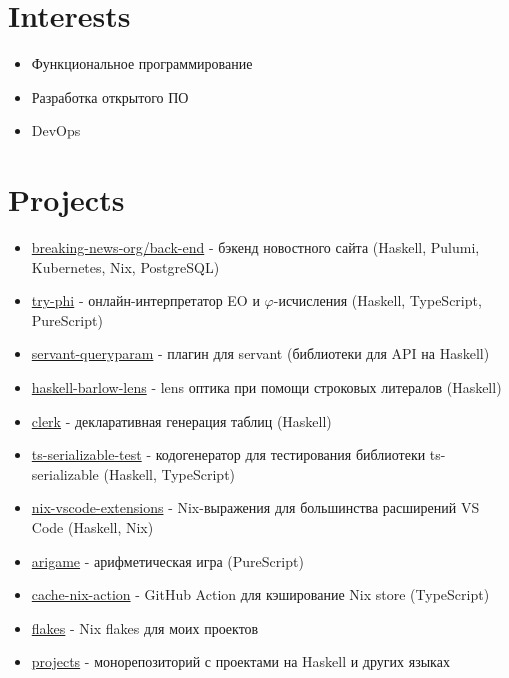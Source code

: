 \documentclass[twocolumn,11pt]{report}
\begin{document}
\section*{Interests}
\begin{itemize}
     \itemsep0em
     \item Функциональное программирование
     \item Разработка открытого ПО
     \item DevOps
\end{itemize}

\section*{Projects}
\begin{itemize}
     \itemsep0em
     \item \href{https://github.com/breaking-news-org/back-end#readme}{breaking-news-org/back-end} - бэкенд новостного сайта (Haskell, Pulumi, Kubernetes, Nix, PostgreSQL)
     \item \href{https://github.com/objectionary/try-phi#readme}{try-phi} - онлайн-интерпретатор EO и $\varphi$-исчисления (Haskell, TypeScript, PureScript)
     \item \href{https://github.com/deemp/servant-queryparam#readme}{servant-queryparam} - плагин для servant (библиотеки для API на Haskell)
     \item \href{https://github.com/deemp/haskell-barlow-lens#readme}{haskell-barlow-lens} - lens оптика при помощи строковых литералов (Haskell)
     \item \href{https://github.com/deemp/clerk#readme}{clerk} - декларативная генерация таблиц (Haskell)
     \item \href{https://github.com/deemp/projects/tree/main/haskell/ts-serializable-test#readme}{ts-serializable-test} - кодогенератор для тестирования библиотеки ts-serializable (Haskell, TypeScript)
     \item \href{https://github.com/nix-community/nix-vscode-extensions#readme}{nix-vscode-extensions} - Nix-выражения для большинства расширений VS Code (Haskell, Nix)
     \item \href{https://github.com/deemp/arigame#readme}{arigame} - арифметическая игра (PureScript)
     \item \href{https://github.com/nix-community/cache-nix-action#readme}{cache-nix-action} - GitHub Action для кэширование Nix store (TypeScript)
     \item \href{https://github.com/deemp/flakes#readme}{flakes} - Nix flakes для моих проектов
     \item \href{https://github.com/deemp/projects#readme}{projects} - монорепозиторий с проектами на Haskell и других языках
\end{itemize}
\end{document}
